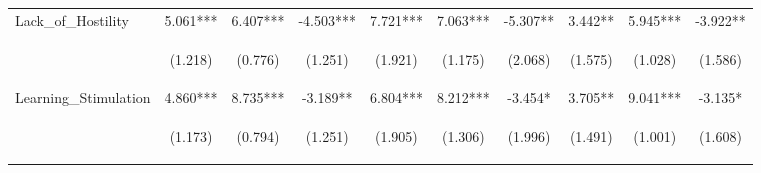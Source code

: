 \begin{tabular}{lccccccccc}
\noalign{\smallskip}Lack_of_Hostility & 5.061*** & 6.407*** & -4.503*** & 7.721*** & 7.063*** & -5.307** & 3.442** & 5.945*** & -3.922**\\
 & \begin{footnotesize}(1.218)\end{footnotesize} & \begin{footnotesize}(0.776)\end{footnotesize} & \begin{footnotesize}(1.251)\end{footnotesize} & \begin{footnotesize}(1.921)\end{footnotesize} & \begin{footnotesize}(1.175)\end{footnotesize} & \begin{footnotesize}(2.068)\end{footnotesize} & \begin{footnotesize}(1.575)\end{footnotesize} & \begin{footnotesize}(1.028)\end{footnotesize} & \begin{footnotesize}(1.586)\end{footnotesize}\\
\noalign{\smallskip}Learning_Stimulation & 4.860*** & 8.735*** & -3.189** & 6.804*** & 8.212*** & -3.454* & 3.705** & 9.041*** & -3.135*\\
 & \begin{footnotesize}(1.173)\end{footnotesize} & \begin{footnotesize}(0.794)\end{footnotesize} & \begin{footnotesize}(1.251)\end{footnotesize} & \begin{footnotesize}(1.905)\end{footnotesize} & \begin{footnotesize}(1.306)\end{footnotesize} & \begin{footnotesize}(1.996)\end{footnotesize} & \begin{footnotesize}(1.491)\end{footnotesize} & \begin{footnotesize}(1.001)\end{footnotesize} & \begin{footnotesize}(1.608)\end{footnotesize}\\

\end{tabular}
